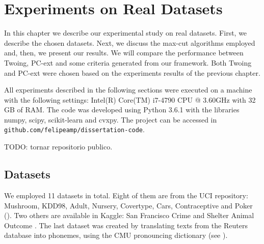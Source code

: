 \newpage

\chapter{Experiments on Real Datasets}
\label{chap:experiments-datasets}


In this chapter we describe our experimental study on real datasets. First, we describe the chosen datasets. Next, we discuss the max-cut algorithms 
employed and, then, we present our results. We will compare the performance between Twoing, PC-ext and some criteria generated from our framework. Both Twoing and PC-ext were chosen based on the experiments results of the previous chapter.

All  experiments described in the following sections were executed on a machine with the following settings: Intel(R) Core(TM) i7-4790 CPU @ 3.60GHz with 32 GB of RAM. The code was developed using Python 3.6.1 with the libraries numpy, scipy, scikit-learn and cvxpy.
The project can be accessed in {\tt github.com/felipeamp/dissertation-code}.

TODO: tornar repositorio publico.


\section{Datasets}
We employed 11 datasets in total. Eight of them are from the UCI repository:
Mushroom, KDD98, Adult, Nursery, Covertype, Cars, Contraceptive and Poker (\cite{Lichman:2013}).
Two others are available in Kaggle: San Francisco Crime and Shelter Animal Outcome
\cite{SFC,AnimalShelter}. The last dataset was created by translating texts from the Reuters database \cite{Lichman:2013} into phonemes, using the CMU pronouncing dictionary (see \cite{CMU-PD}).

